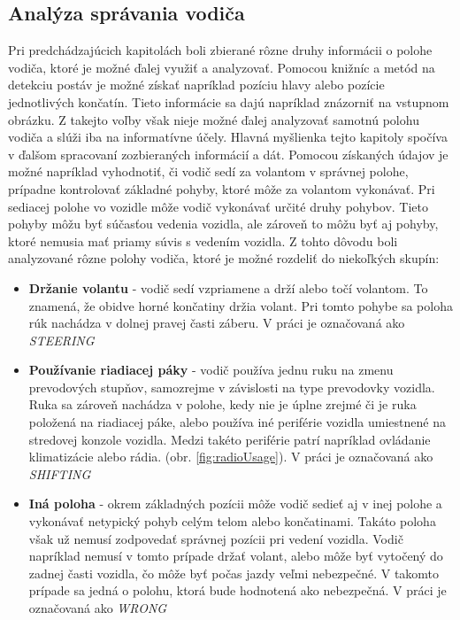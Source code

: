 \documentclass[slovak,master,dept460,male,cpp,cpdeclaration]{diploma}
\begin{document}
\newpage
\subsection{Analýza správania vodiča}
\label{sec:neuralNetwork}
Pri predchádzajúcich kapitolách boli zbierané rôzne druhy informácii o polohe vodiča, ktoré je možné ďalej využiť  a analyzovať. Pomocou   knižníc  a metód na detekciu postáv  je možné získať napríklad  pozíciu hlavy alebo pozície jednotlivých končatín.  Tieto informácie sa dajú napríklad znázorniť na vstupnom obrázku. Z takejto voľby však  nieje možné ďalej analyzovať samotnú polohu vodiča a slúži iba na informatívne účely. Hlavná myšlienka tejto kapitoly spočíva v ďalšom spracovaní zozbieraných informácií a dát. Pomocou získaných údajov je možné napríklad vyhodnotiť, či vodič sedí za volantom v správnej polohe, prípadne kontrolovať základné pohyby, ktoré môže za volantom vykonávať. Pri sediacej polohe vo vozidle môže vodič vykonávať určité druhy pohybov. Tieto pohyby môžu byť súčasťou vedenia vozidla, ale zároveň to môžu byť aj pohyby, ktoré nemusia  mať priamy súvis s vedením vozidla. Z tohto dôvodu boli analyzované rôzne polohy vodiča, ktoré je možné rozdeliť do niekoľkých skupín:
\begin{itemize}
\item \textbf{Držanie volantu} - vodič sedí vzpriamene a drží alebo točí volantom. To znamená, že obidve horné končatiny držia volant. Pri tomto pohybe sa poloha rúk nachádza v dolnej pravej časti záberu. V práci je označovaná ako \textit{STEERING}
\item\textbf{Používanie riadiacej páky} - vodič používa jednu ruku na zmenu prevodových stupňov, samozrejme v závislosti na type prevodovky vozidla. Ruka sa zároveň nachádza v polohe, kedy nie je  úplne zrejmé či je ruka položená na riadiacej páke, alebo používa iné periférie vozidla umiestnené na stredovej konzole vozidla. Medzi takéto periférie patrí napríklad ovládanie klimatizácie alebo rádia. (obr. \ref{fig:radioUsage}).  V práci je označovaná ako \textit{SHIFTING}
\item\textbf{Iná poloha} - okrem základných pozícii môže vodič sedieť aj v inej polohe a vykonávať netypický pohyb celým telom alebo končatinami. Takáto poloha však už nemusí zodpovedať správnej pozícii  pri vedení vozidla. Vodič napríklad nemusí v tomto prípade držať volant, alebo môže byť vytočený do zadnej časti vozidla, čo môže byť počas jazdy veľmi nebezpečné. V takomto prípade sa jedná o polohu, ktorá bude hodnotená ako nebezpečná. V práci je označovaná ako \textit{WRONG}
\end{itemize}
\end{document}
